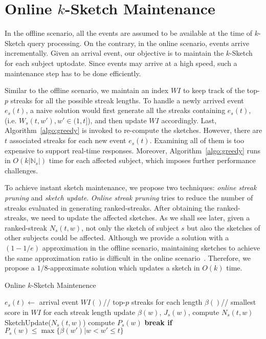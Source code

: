 \section {Online $k$-Sketch Maintenance}\label{sec:online}
In the offline scenario, all the events are assumed 
to be available at the time of $k$-Sketch query processing. 
On the contrary, in the online scenario,
events arrive incrementally. 
Given an arrival event, our objective is to maintain the $k$-Sketch 
for each subject uptodate. Since events may arrive at a high speed, %
such a maintenance step has to be done efficiently.  

Similar to the offline scenario, we maintain an index $WI$  to keep 
track of the top-$p$ streaks 
for all the possible streak lengths.
To handle a newly arrived event $e_s(t)$, a naive solution would first generate
all the streaks containing $e_s(t)$, (i.e. $W_s(t,w'), w'\in(1,t]$), and then
update $WI$ accordingly.
Last, Algorithm~\ref{algo:greedy} is invoked to re-compute the sketches. 
However, there are $t$ associated streaks for each new event $e_s(t)$. 
Examining all of them is too expensive to support real-time responses. 
Moreover, Algorithm~\ref{algo:greedy} runs in $O(k|\mathbb{N}_s|)$ 
time for each affected subject, which imposes further performance challenges. 

To achieve instant sketch maintenance, we propose two techniques: \emph{online streak pruning} and \emph{sketch update}. 
\emph{Online streak pruning} tries to reduce the number of streaks evaluated in generating ranked-streaks. 
After obtaining the ranked-streaks, we need to update the affected sketches.
As we shall see later, given a ranked-streak $N_s(t,w)$, 
not only the sketch of subject $s$ but also the sketches of other subjects could be affected. 
Although we provide a solution with a $(1-1/e)$ approximation in the offline scenario, 
maintaining sketches to achieve the same approximation ratio 
is difficult in the online scenario~\cite{Alonerbuch2003The,Awerbuch1996Making}. 
Therefore, we propose a $1/8$-approximate solution which updates a sketch in $O(k)$ time.

\begin{algorithm}[h]
\caption{Online $k$-Sketch Maintenence}\label{algo:online_overview}
\begin{algorithmic}[1]
\Require $e_s(t) \gets $ arrival event
\State $WI()$// top-$p$ streaks for each length
\State $\beta()$// smallest score in $WI$ for each streak length
\State update $\beta(w)$, $J_s(w)$, compute $N_s(t,w)$ 
\State SketchUpdate($N_s(t,w)$)
\EndIf
\State compute $P_s(w)$
\State \bf{break} if $P_s(w)\leq \max\{\beta(w')|w < w' \leq t\}$
\EndFor
\end{algorithmic}
\end{algorithm}

